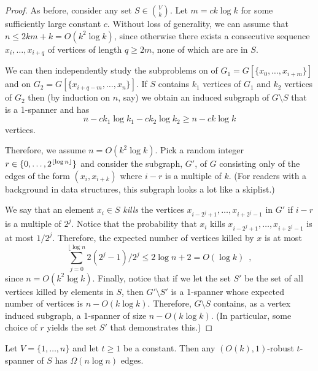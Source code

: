 \documentclass{patmorin}
\begin{document}
\begin{proof}
As before, consider any set $S\in\binom{V}{k}$.  Let $m=ck\log k$
for some sufficiently large constant $c$.  Without loss of generality,
we can assume that $n\le 2km+k = O(k^2\log k)$, since otherwise there
exists a consecutive sequence $x_i,\ldots,x_{i+q}$ of vertices of length
$q\ge 2m$, none of which are are in $S$.

We can then independently study the subproblems on
of $G_1=G[\{x_0,\ldots,x_{i+m}\}]$
and on
$G_2=G[\{x_{i+q-m},\ldots,x_{n}\}]$.
If $S$ contains $k_1$ vertices of $G_1$ and $k_2$ vertices of $G_2$ then
(by induction on $n$, say) we obtain an induced subgraph of $G\setminus S$
that is a 1-spanner and has
\[ n-ck_1\log k_1 - ck_2\log k_2 \ge n - ck\log k
\]
vertices.

Therefore, we assume $n = O(k^2\log k)$.  Pick a random integer
$r\in\{0,\ldots,2^{{\lfloor \log n \rfloor}}\}$ and consider the subgraph, $G'$,
of $G$ consisting only of the edges of the form $(x_i,x_{i+k})$ where
$i-r$ is a multiple of $k$.  (For readers with a background in data
structures, this subgraph looks a lot like a skiplist.)

We say that an element $x_i\in S$ \emph{kills} the vertices
$x_{i-2^{j}+1},\ldots,x_{i+2^{j}-1}$ in $G'$ if $i-r$ is a
multiple of $2^j$.  Notice that the probability that $x_i$ kills
$x_{i-2^{j}+1},\ldots,x_{i+2^{j}-1}$ is at most $1/2^j$.  Therefore,
the expected number of vertices killed by $x$ is at most
\[
    \sum_{j=0}^{\lfloor{\log n}} 2(2^j-1)/2^j \le 2\log n + 2 = O(\log k) \enspace ,
\]
since $n=O(k^2\log k)$.  Finally, notice that if we let the set $S'$
be the set of all vertices killed by elements in $S$, then $G'\setminus
S'$ is a 1-spanner whose expected number of vertices is $n-O(k\log k)$.
Therefore, $G\setminus S$ contains, as a vertex induced subgraph,
a 1-spanner of size $n-O(k\log k)$.  (In particular, some choice of $r$ yields the set $S'$ that demonstrates this.)
\end{proof}



\begin{thm}
Let $V=\{1,\ldots,n\}$ and let $t\ge 1$ be a constant.  Then any
$(O(k),1)$-robust $t$-spanner of $S$ has $\Omega(n\log n)$ edges.
\end{thm}
\end{document}

